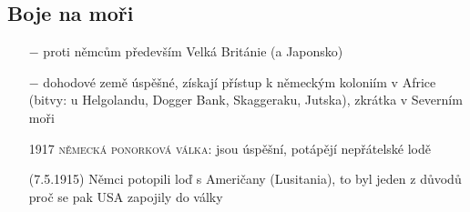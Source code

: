 \documentclass{article}
\begin{document}
\subsection*{Boje na moři}
\begin{itemize}
    \vspace{-0.5em}
    \setlength\itemsep{0.15em}
    \item[$-$] proti němcům především Velká Británie (a Japonsko)
    \item[$-$] dohodové země úspěšné, získají přístup k německým koloniím v Africe (bitvy: u Helgolandu, Dogger Bank, Skaggeraku, Jutska), zkrátka v Severním moři
    \item[1917] \textsc{německá ponorková válka}: jsou úspěšní, potápějí nepřátelské lodě
    \item[(7.5.1915)] Němci potopili loď s Američany (Lusitania), to byl jeden z důvodů proč se pak USA zapojily do války
\end{itemize}
\end{document}
